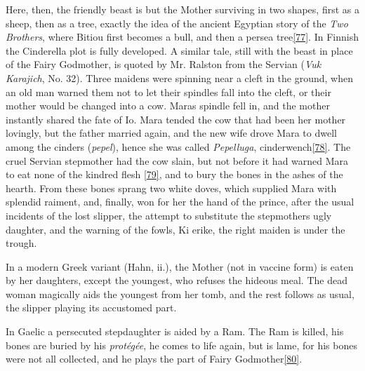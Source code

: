 \documentclass[14pt,a4paper]{memoir}
\begin{document}
Here, then, the friendly beast is but the Mother surviving in two
shapes, first as a sheep, then as a tree, exactly the idea of the
ancient Egyptian story of the \emph{Two Brothers}, where Bitiou first
becomes a bull, and then a persea
tree\protect\hypertarget{4533318093929944247_33931-h-1.htm.xhtmlux5cux23FNanchor_77}{}{}\protect\hyperlink{4533318093929944247_33931-h-1.htm.xhtmlux5cux23Footnote_77}{{[}77{]}}.
In Finnish the Cinderella plot is fully developed. A similar tale, still
with the beast in place of the Fairy Godmother, is quoted by Mr. Ralston
from the Servian (\emph{Vuk Karajich}, No. 32). Three maidens were
spinning near a cleft in the ground, when an old man warned them not to
let their spindles fall into the cleft, or their mother would be changed
into a cow. Mara\textquotesingle s spindle fell in, and the mother
instantly shared the fate of Io. Mara tended the cow that had been her
mother lovingly, but the father married again, and the new wife drove
Mara to dwell among the cinders (\emph{pepel}), hence she was called
\emph{Pepelluga},
cinderwench\protect\hypertarget{4533318093929944247_33931-h-1.htm.xhtmlux5cux23FNanchor_78}{}{}\protect\hyperlink{4533318093929944247_33931-h-1.htm.xhtmlux5cux23Footnote_78}{{[}78{]}}.
The cruel Servian stepmother had the cow slain, but not before it had
warned Mara to eat none of the kindred
flesh\protect\hypertarget{4533318093929944247_33931-h-1.htm.xhtmlux5cux23FNanchor_79}{}{}
\protect\hyperlink{4533318093929944247_33931-h-1.htm.xhtmlux5cux23Footnote_79}{{[}79{]}},
and to bury the bones in the ashes of the hearth. From these bones
sprang two white doves, which supplied Mara with splendid raiment, and,
finally, won for her the hand of the prince, after the usual incidents
of the lost slipper, the attempt to substitute the
stepmother\textquotesingle s ugly daughter, and the warning of the
fowls, \textquotesingle Ki erike, the right maiden is under the
trough.\textquotesingle{}

In a modern Greek variant (Hahn, ii.), the Mother (not in vaccine form)
is eaten by her daughters, except the youngest, who refuses the hideous
meal. The dead woman magically aids the youngest from her tomb, and the
rest follows as usual, the slipper playing its accustomed part.

In Gaelic a persecuted stepdaughter is aided by a Ram. The Ram is
killed, his bones are buried by his \emph{protégée}, he comes to life
again, but is lame, for his bones were not all collected, and he plays
the part of Fairy
Godmother\protect\hypertarget{4533318093929944247_33931-h-1.htm.xhtmlux5cux23FNanchor_80}{}{}\protect\hyperlink{4533318093929944247_33931-h-1.htm.xhtmlux5cux23Footnote_80}{{[}80{]}}.
\end{document}
